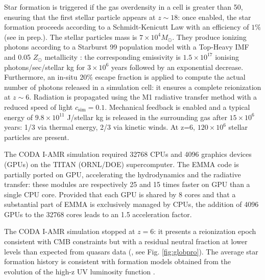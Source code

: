 \documentclass[twocolumn]{aastex61}
\newcommand{\dom}[1]{{#1}}
\begin{document}
Star formation is triggered if the gas overdensity in a cell is greater than 50, ensuring that the first stellar particle appears at $z\sim 18$: once enabled, the star formation proceeds according to a Schmidt-Kenicutt Law with an efficiency of $1\%$ (see \citet{DEP17} in prep.). The stellar particles mass is  $7\times 10^4 M_\odot$. They produce ionizing photons according to a Starburst 99 population model \citep{LEI99} with a Top-Heavy IMF and 0.05 $Z_\odot$ metallicity : the corresponding emissivity is $1.5\times 10^{17}$ ionising photons/sec/stellar kg for $3\times 10^6$ years followed by an exponential decrease. Furthermore, an in-situ $20\%$ escape fraction is applied to compute the actual number of photons released in a simulation cell: it ensures a complete reionization at $z\sim 6$.  \dom{Radiation is propagated using the M1 radiative transfer method with a reduced speed of light $c_\mathrm{sim}=0.1$}. Mechanical feedback is enabled and a typical energy of $9.8\times 10^{11}$ J/stellar kg is released in the surrounding gas after $15\times 10^6$ years: 1/3 via thermal energy, 2/3 via kinetic winds. At z=6, $120\times 10^6$ stellar particles are present.

The CODA I-AMR simulation required 32768 CPUs and 4096 graphics devices (GPUs) on the TITAN (ORNL/DOE) supercomputer. The EMMA code is partially ported on GPU, accelerating the hydrodynamics and the radiative transfer: these modules are respectively 25 and 15 times faster on GPU than a single CPU core. Provided that each GPU is shared by 8 cores and that a substantial part of EMMA is exclusively managed by CPUs, the addition of 4096 GPUs to the 32768 cores leads to an 1.5 acceleration factor. 


The CODA I-AMR simulation stopped at $z=6$: it presents a reionization epoch consistent with CMB constraints \citep{PLA15} but with a residual neutral fraction at lower levels than expected from quasars data (\citet{FAN6}, see Fig. \ref{fig:globpro}). The average star formation history is consistent with formation models obtained from the evolution of the high-z UV luminosity function \citep{BOU14,FIN15}.  
\end{document}
